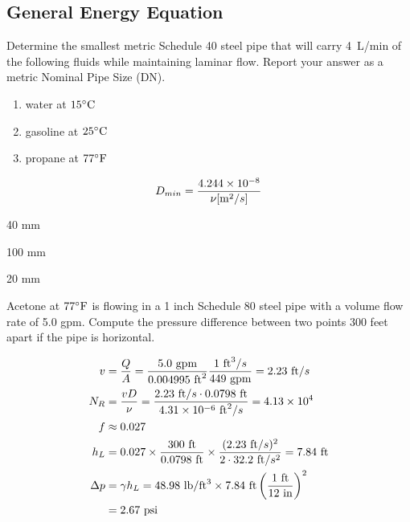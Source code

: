 \documentclass[multi,preview,varwidth=false,border=5,12pt]{standalone}
\begin{document}
\begin{center}
\section*{General Energy Equation}
\end{center}

\begin{question}

Determine the smallest metric Schedule 40 steel pipe that will carry 4~L/min of the following fluids while maintaining laminar flow.  Report your answer as a metric Nominal Pipe Size (DN).

\begin{enumerate}

\item water at $15^\circ\mathrm{C}$

\item gasoline at $25^\circ\mathrm{C}$

\item propane at $77^\circ\mathrm{F}$

\end{enumerate}


\begin{solution}
$$
D_{min}=\frac{4.244\times 10^{-8}}{\nu [\mathrm{m}^2/s]}
$$

40 mm

100 mm

20 mm

\end{solution}

\end{question}

\begin{question}
Acetone at $77^\circ\mathrm{F}$ is flowing in a 1 inch Schedule 80 steel pipe with a volume flow rate of 5.0 gpm. Compute the pressure difference between two points 300 feet apart if the pipe is horizontal.

\begin{solution}

\begin{align*}
v&=\frac{Q}{A}=\frac{5.0~\textrm{gpm}}{0.004995~\mathrm{ft}^2}\frac{1~\mathrm{ft}^3/s}{449~ \textrm{gpm}}=2.23~\mathrm{ft}/s \\
N_R&=\frac{vD}{\nu}=\frac{2.23~\mathrm{ft}/s\cdot 0.0798~\mathrm{ft}}{4.31\times 10^{-6}~\mathrm{ft}^2/s}=4.13\times 10^4 \\
f&\approx 0.027 \\
h_L&=0.027\times \frac{300~\mathrm{ft}}{0.0798~\mathrm{ft}}\times \frac{(2.23~\mathrm{ft}/s)^2}{2\cdot 32.2~\mathrm{ft}/s^2}=7.84~\mathrm{ft} \\
\Delta p&=\gamma h_L = 48.98~\mathrm{lb}/\mathrm{ft}^3\times 7.84~\mathrm{ft} \left(\frac{1~\mathrm{ft}}{12~\mathrm{in}}\right)^2\\
&=2.67~\mathrm{psi}
\end{align*}

\end{solution}

\end{question}
\end{document}
